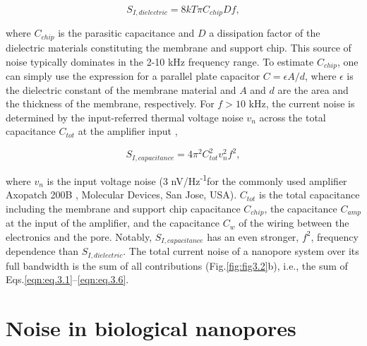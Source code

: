 \begin{equation}\label{eqn:eq.3.5}
S_{I,dielectric}=8kT\pi C_{chip}Df,
\end{equation}

\noindent where $C_{chip}$ is the parasitic capacitance and $D$ a dissipation factor of the dielectric materials constituting the membrane and support chip. This source of noise typically dominates in the 2-10 kHz frequency range. To estimate $C_{chip}$, one can simply use the expression for a parallel plate capacitor $C=\epsilon A/d$, where $\epsilon$ is the dielectric constant of the membrane material and $A$ and $d$ are the area and the thickness of the membrane, respectively. For $f>10$ kHz, the current noise is determined by the input-referred thermal voltage noise $v_n$ across the total capacitance $C_{tot}$ at the amplifier input \cite{Sakmann2009,Tabard-Cossa2013},

\begin{equation}\label{eqn:eq.3.6}
S_{I,capacitance}=4\pi^2C_{tot}^2v_n^2f^2,
\end{equation}


\noindent where $v_n$ is the input voltage noise (3 nV/Hz\textsuperscript{-1}for the commonly used amplifier Axopatch 200B \cite{Sherman-Gold2012}, Molecular Devices, San Jose, USA). $C_{tot}$ is the total capacitance including the membrane and support chip capacitance $C_{chip}$, the capacitance $C_{amp}$ at the input of the amplifier, and the capacitance $C_w$ of the wiring between the electronics and the pore. Notably, $S_{I,capacitance}$ has an even stronger, $f^2$, frequency dependence than $S_{I,dielectric}$. The total current noise of a nanopore system over its full bandwidth is the sum of all contributions (Fig.\ref{fig:fig3.2}b), i.e., the sum of Eqs.\ref{eqn:eq.3.1}–\ref{eqn:eq.3.6}.  


\section{Noise in biological nanopores}

